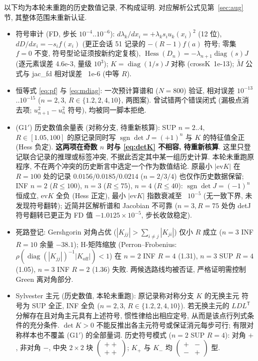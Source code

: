 \documentclass[UTF8]{ctexart}
\begin{document}
以下均为本轮未重跑的历史数值记录, 不构成证明.
对应解析公式见第~\ref{sec:aug} 节, 其整体范围未重新认证.

\begin{itemize}
	\item 符号审计 (FD, 步长 $10^{-4}$..$10^{-6}$):
	$d\lambda_k/dx_i=+\lambda_ks_iu_k(x_i)^2$ (12 位),
	$dD/dx_i=-s_if(x_i)$ (更正会话 51 记录的 $-(R-1)f(a)$ 符号;
	零集 $f=0$ 不变, 符号型论证须按新约定复核),
	$\operatorname{Hess}(D_n)=-\lambda_{n+1}\operatorname{diag}(s)J$
	(逐元素误差 4.6e-3, 量级 $10^3$);
	$K=\operatorname{diag}(1/s)J$ 对称 (crossK~1e-13);
	$\tilde M$ 公式与 jac\_fd 相对误差 ~1e-6 (中等 $R$).
	\item 恒等式 \eqref{eq:pf} 与 \eqref{eq:mdiag}: 一次预计算谱和
	($N=800$) 验证, 相对误差 $10^{-13}$..$10^{-15}$
	($n=2,3$, $R\in\{1.2,2,4,10\}$, 两图案). 曾试错两个错误闭式
	(漏极点消去项; $u_{n+1}^2-u_n^2$ 符号), 均被同一脚本拒绝.
	\item (G1$'$) 历史数值余量表 (对称分支, 待重新核算):
	SUP $n=2..4$, $R\in[1.05,100]$ 的原记录同时写
	$\operatorname{sgn}\det J=(+1)^n$ 与 $K$ 的特征值全正 (Hess 负定).
	\textbf{这两项在奇数 $n$ 时与 \eqref{eq:detK} 不相容, 待重新核算}.
	这里只登记联合记录的推理或标签冲突, 不据此否定其中某一组历史计算.
	本轮未重跑原程序, 不在两个冲突的历史断言中选定一个作为数值结论.
	原最小 $|\mathrm{ev}K|$ 在 $R=100$ 处的记录
	$0.0156/0.0185/0.0214$ ($n=2/3/4$) 也仅作历史数据保留;
	INF $n=2$ ($R\le100$), $n=3$ ($R\le75$), $n=4$ ($R\le40$):
	$\operatorname{sgn}\det J=(-1)^n$ 恒成立, ev$K$ 全负 (Hess 正定),
	最小 $|\mathrm{ev}K|$ 指数衰减至 ~$10^{-5}$ (无一致下界, 未发现符号翻转);
	近简并区解析谱和 Jacobian 不可靠 ($n=3,R=75$ 处伪 detJ 符号翻转已更正为
	FD 值 $-1.0125\times10^{-5}$, 步长收敛稳定).
	\item 死路登记: Gershgorin 对角占优 ($|K_{jj}|>\sum_{i\ne j}|K_{ji}|$)
	仅小 $R$ 成立 ($n=3$ INF $R=10$ 余量 $-38.1$); H-矩阵缩放
	(Perron--Frobenius: $\rho(\operatorname{diag}(|K_{jj}|)^{-1}|K_{\mathrm{off}}|)<1$)
	在 $n=2$ INF $R=4$ (1.31), $n=3$ SUP $R=4$ (1.05), $n=3$ INF $R=2$ (1.36)
	失败. 两候选路线均被否证, 严格证明需控制 Green 离对角部分.
	\item Sylvester 主元 (历史数值, 本轮未重跑): 原记录称对称分支 $K$ 的无换主元
	符号为 SUP 全正, INF 全负 ($n=2,3$, $R\in\{1.2,2,4,10\}$).
	若无换主元的 $LDL^{\mathsf T}$ 分解存在且对角主元具有上述符号,
	惯性律给出相应定号, 从而是该点行列式条件的充分条件.
	$\det K>0$ 不能反推出各主元符号或保证消元每步可行;
	有限对称样本也不覆盖 (G1$'$) 的全部量词. 历史符号模式
	($n=2$ SUP $R=4$): 对角 $+$, 非对角 $-$, 中央 $2\times2$ 块
	$\left(\begin{smallmatrix}++\\++\end{smallmatrix}\right)$;
	$K_+$ 与 $K_-$ 均 $\left(\begin{smallmatrix}+&-\\-&+\end{smallmatrix}\right)$ 型.
\end{itemize}
\end{document}
